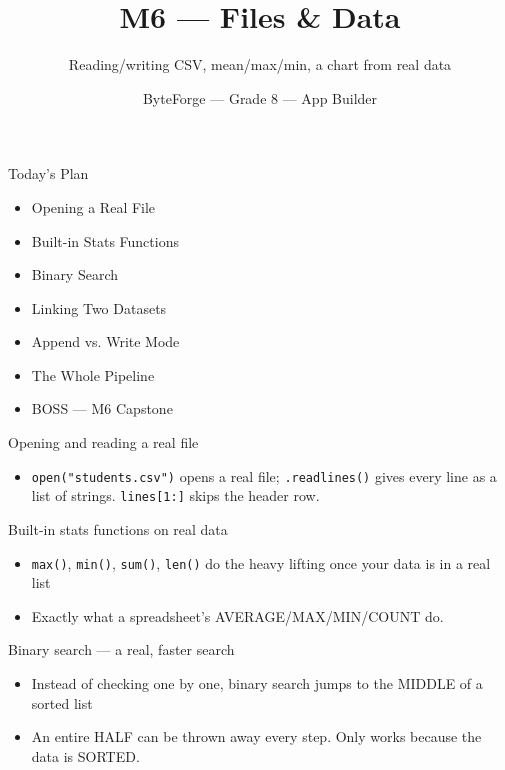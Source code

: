 \documentclass[aspectratio=169]{beamer}
\title{M6 — Files \& Data}
\subtitle{Reading/writing CSV, mean/max/min, a chart from real data}
\author{ByteForge --- Grade 8 --- App Builder}
\date{}
\begin{document}
\begin{frame}
    \titlepage
\end{frame}

\begin{frame}{Today's Plan}
    \begin{itemize}
        \item Opening a Real File
        \item Built-in Stats Functions
        \item Binary Search
        \item Linking Two Datasets
        \item Append vs. Write Mode
        \item The Whole Pipeline
        \item[$\bigstar$] BOSS --- M6 Capstone
    \end{itemize}
\end{frame}

\begin{frame}{Opening and reading a real file}
    \large
    \begin{itemize}
        \item \texttt{open("students.csv")} opens a real file; \texttt{.readlines()} gives every line as a list of strings. \texttt{lines[1:]} skips the header row.
    \end{itemize}
\end{frame}


\begin{frame}{Built-in stats functions on real data}
    \large
    \begin{itemize}
        \item \texttt{max()}, \texttt{min()}, \texttt{sum()}, \texttt{len()} do the heavy lifting once your data is in a real list
        \item Exactly what a spreadsheet's AVERAGE/MAX/MIN/COUNT do.
    \end{itemize}
\end{frame}


\begin{frame}{Binary search — a real, faster search}
    \large
    \begin{itemize}
        \item Instead of checking one by one, binary search jumps to the MIDDLE of a sorted list
        \item An entire HALF can be thrown away every step. Only works because the data is SORTED.
    \end{itemize}

    \begin{center}
    \end{center}
\end{frame}
\end{document}
